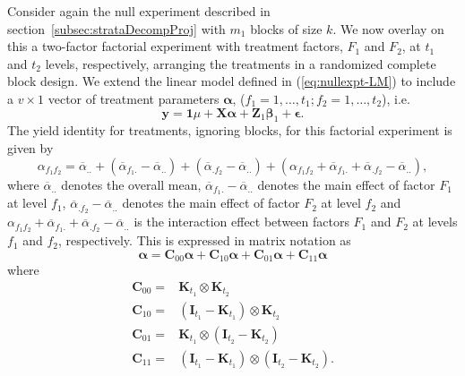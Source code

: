\documentclass[article]{jss}
\newcommand{\I}{\mathbf{I}}
\newcommand{\K}{\mathbf{K}}
\newcommand{\Z}{\mathbf{Z}}
\newcommand{\X}{\mathbf{X}}
\newcommand{\C}{\mathbf{C}}
\begin{document}
Consider again the null experiment described in section~\ref{subsec:strataDecompProj} with $m_1$ blocks of size $k$. We now overlay on this a two-factor factorial experiment with treatment factors, $F_1$ and $F_2$, at $t_1$ and $t_2$ levels, respectively, arranging the treatments in a randomized complete block design. We extend the linear model defined in (\ref{eq:nullexpt-LM}) to include a $v\times 1$ vector of treatment parameters $\bm{\alpha}$, ($f_1= 1,\dots, t_1; f_2 = 1,\dots,t_2$), i.e.\
\begin{equation}\label{eq:factexpt-in-rcbd-LM}
\bm{y} = \mathbf{1}\mu + \X\bm{\alpha} + \Z_1\bm{\beta}_1 + \bm{\epsilon}.
\end{equation}
The yield identity for treatments, ignoring blocks, for this factorial experiment is given by
\begin{equation}
\label{eq:yieldIdentityFactorial}
\alpha_{f_1 f_2} = \overline{\alpha}_{..}+(\overline{\alpha}_{f_1 .} -\overline{\alpha}_{..}) + (\overline{\alpha}_{.f_2} -\overline{\alpha}_{..}) +(\alpha_{f_1 f_2} + \overline{\alpha}_{f_1 .} + \overline{\alpha}_{.f_2} -\overline{\alpha}_{..}),
\end{equation}
where $\overline{\alpha}_{..}$ denotes the overall mean, $\overline{\alpha}_{f_1.} -\overline{\alpha}_{..}$ denotes the main effect of factor $F_1$ at level $f_1$, $\overline{\alpha}_{.f_2} -\overline{\alpha}_{..}$ denotes the main effect of factor $F_2$ at level $f_2$ and $\alpha_{f_1 f_2} + \overline{\alpha}_{f_1.} + \overline{\alpha}_{. f_2} -\overline{\alpha}_{..}$ is the interaction effect between factors $F_1$ and $F_2$ at levels $f_1$ and $f_2$, respectively. This is expressed in matrix notation as
\[
\bm{\alpha} =  \C_{00} \bm{\alpha} +   \C_{10} \bm{\alpha} +   \C_{01} \bm{\alpha} +   \C_{11} \bm{\alpha} 
\]
where
\begin{eqnarray}
\nonumber \C_{00} = & \K_{t_1} \otimes \K_{t_2}\\
\nonumber \C_{10} = & (\I_{t_1} - \K_{t_1}) \otimes \K_{t_2} \\
\nonumber \C_{01} = & \K_{t_1} \otimes (\I_{t_2} - \K_{t_2})\\
\nonumber \C_{11} = & (\I_{t_1} - \K_{t_1}) \otimes (\I_{t_2} - \K_{t_2}).
\end{eqnarray}
\end{document}
